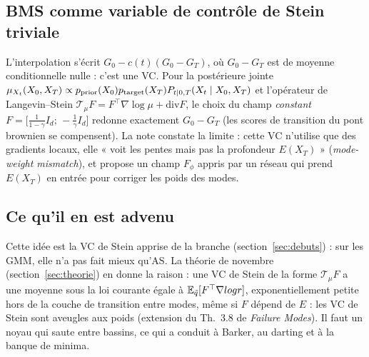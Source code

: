 \subsection{BMS comme variable de contrôle de Stein triviale}
L'interpolation s'écrit $G_0-c(t)(G_0-G_T)$, où $G_0-G_T$ est de moyenne conditionnelle nulle : c'est une VC. Pour la postérieure jointe $\mu_{X_t}(X_0,X_T)\propto p_{\rm prior}(X_0)p_{\rm target}(X_T)P_{t|0,T}(X_t\mid X_0,X_T)$ et l'opérateur de Langevin--Stein $\mathcal T_{\mu}F=F^\top\nabla\log\mu+\mathrm{div}F$, le choix du champ \emph{constant} $F=\big[\tfrac1{1-\gamma}I_d;\,-\tfrac1{\gamma}I_d\big]$ redonne exactement $G_0-G_T$ (les scores de transition du pont brownien se compensent). La note constate la limite : cette VC n'utilise que des gradients locaux, elle « voit les pentes mais pas la profondeur $E(X_T)$ » (\emph{mode-weight mismatch}), et propose un champ $F_\phi$ appris par un réseau qui prend $E(X_T)$ en entrée pour corriger les poids des modes.

\subsection{Ce qu'il en est advenu}
Cette idée est la VC de Stein apprise de la branche  (section~\ref{sec:debuts}) : sur les GMM, elle n'a pas fait mieux qu'AS. La théorie de novembre (section~\ref{sec:theorie}) en donne la raison : une VC de Stein de la forme $\mathcal T_\mu F$ a une moyenne sous la loi courante égale à $\mathbb{E}_{\tilde q}[F^\top\nabla log r]$, exponentiellement petite hors de la couche de transition entre modes, même si $F$ dépend de $E$ : les VC de Stein sont aveugles aux poids (extension du Th.~3.8 de \emph{Failure Modes}). Il faut un noyau qui saute entre bassins, ce qui a conduit à Barker, au darting et à la banque de minima.
